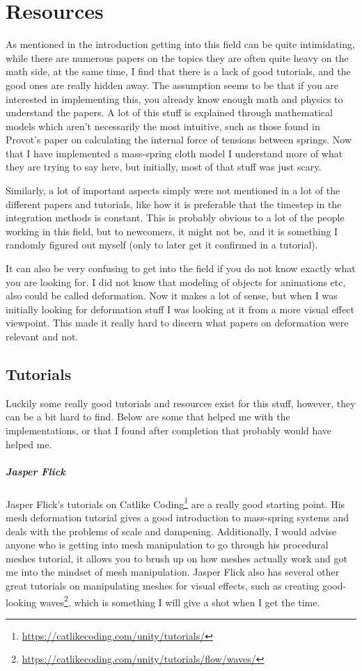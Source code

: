 \chapter{Resources}
As mentioned in the introduction getting into this field can be quite intimidating,
while there are numerous papers on the topics they are often quite heavy on the math side,
at the same time, I find that there is a lack of good tutorials, and the good ones are really hidden away.
The assumption seems to be that if you are interested in implementing this, 
you already know enough math and physics to understand the papers.
A lot of this stuff is explained through mathematical models which aren't necessarily the most intuitive,
such as those found in Provot's paper\cite{provot_mass_spring} on calculating the internal force of tensions between springs.
Now that I have implemented a mass-spring cloth model I understand more of what they are trying to say here,
but initially, most of that stuff was just scary.

Similarly, a lot of important aspects simply were not mentioned in a lot of the different papers and tutorials,
like how it is preferable that the timestep in the integration methods is constant.
This is probably obvious to a lot of the people working in this field, but to newcomers, it might not be,
and it is something I randomly figured out myself (only to later get it confirmed in a tutorial).

It can also be very confusing to get into the field if you do not know exactly what you are looking for. 
I did not know that modeling of objects for animations etc, also could be called deformation.
Now it makes a lot of sense, but when I was initially looking for deformation stuff I was looking at it from a more visual effect
viewpoint. This made it really hard to discern what papers on deformation were relevant and not.

\section{Tutorials}
Luckily some really good tutorials and resources exist for this stuff, however, they can be a bit hard to find.
Below are some that helped me with the implementations, or that I found after completion that probably would have helped me.

\paragraph{Jasper Flick}
Jasper Flick's tutorials on Catlike Coding\footnote{\url{https://catlikecoding.com/unity/tutorials/}}
are a really good starting point. His mesh deformation tutorial gives a good introduction to mass-spring systems and deals with the problems of scale and dampening.
Additionally, I would advise anyone who is getting into mesh manipulation to go through his procedural meshes tutorial,
it allows you to brush up on how meshes actually work and got me into the mindset of mesh manipulation.
Jasper Flick also has several other great tutorials on manipulating meshes for visual effects, such as creating good-looking waves\footnote{\url{https://catlikecoding.com/unity/tutorials/flow/waves/}}, which is something I will give a shot when I get the time.

